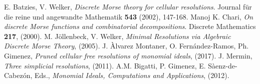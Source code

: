 \documentclass[paper=a4, fontsize=11pt]{scrartcl} %
\theoremstyle{plain}
\theoremstyle{definition}
\begin{document}
\begin{thebibliography}{9}
E. Batzies, V. Welker, \textit{Discrete Morse theory for cellular resolutions}. Journal f{\"u}r die reine und angewandte Mathematik \textbf{543} (2002), 147-168.
Manoj K. Chari, \textit{On discrete Morse functions and combinatorial decompositions}. Discrete Mathematics \textbf{217}, (2000).
M. J{\"o}llenbeck, V. Welker, \textit{Minimal Resolutions via Algebraic Discrete Morse Theory}, (2005).
J. \`Alvarez Montaner, O. Fern\'andez-Ramos, Ph. Gimenez, \textit{Pruned cellular free resolutions of monomial ideals}, (2017).
J. Mermin, \textit{Three simplicial resolutions}, (2011).
A.M. Bigatti, P. Gimenez, E. S\`aenz-de-Cabez\'on, Eds., \textit{Monomial Ideals, Computations and Applications}, (2012).
\end{thebibliography}
\end{document}
